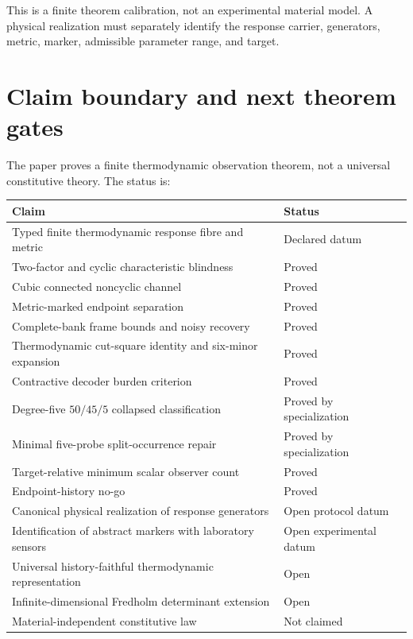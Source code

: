 This is a finite theorem calibration, not an experimental material model. A physical realization must separately identify the response carrier, generators, metric, marker, admissible parameter range, and target.

\section{Claim boundary and next theorem gates}

The paper proves a finite thermodynamic observation theorem, not a universal constitutive theory. The status is:

\begin{center}
\begin{tabular}{p{}p{}}
\toprule
Claim & Status\\
\midrule
Typed finite thermodynamic response fibre and metric & Declared datum\\
Two-factor and cyclic characteristic blindness & Proved\\
Cubic connected noncyclic channel & Proved\\
Metric-marked endpoint separation & Proved\\
Complete-bank frame bounds and noisy recovery & Proved\\
Thermodynamic cut-square identity and six-minor expansion & Proved\\
Contractive decoder burden criterion & Proved\\
Degree-five $50/45/5$ collapsed classification & Proved by specialization\\
Minimal five-probe split-occurrence repair & Proved by specialization\\
Target-relative minimum scalar observer count & Proved\\
Endpoint-history no-go & Proved\\
Canonical physical realization of response generators & Open protocol datum\\
Identification of abstract markers with laboratory sensors & Open experimental datum\\
Universal history-faithful thermodynamic representation & Open\\
Infinite-dimensional Fredholm determinant extension & Open\\
Material-independent constitutive law & Not claimed\\
\bottomrule
\end{tabular}
\end{center}


